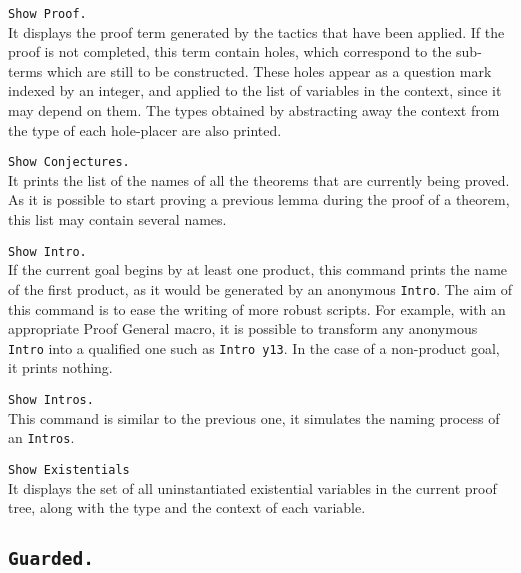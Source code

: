 \begin{Variants}
\item {\tt Show Proof.}\\
It displays the proof term generated by the 
tactics that have been applied. 
If the proof is not completed, this term contain holes,
which correspond to the sub-terms which are still to be 
constructed. These holes appear as a question mark indexed 
by an integer, and applied to the list of variables in 
the context, since it may depend on them. 
The types obtained by abstracting away the context from the
type of each hole-placer are also printed.

\item {\tt Show Conjectures.}\\
It prints the list of the names of all the theorems that 
are currently being proved.
As it is possible to start proving a previous lemma during
the proof of a theorem, this list may contain several 
names. 

\item{\tt Show Intro.}\\
If the current goal begins by at least one product, this command
prints the name of the first product, as it would be generated by 
an anonymous {\tt Intro}. The aim of this command is to ease the
writing of more robust scripts. For example, with an appropriate 
Proof General macro, it is possible to transform any anonymous {\tt
  Intro} into a qualified one such as {\tt Intro y13}.
In the case of a non-product goal, it prints nothing. 

\item{\tt Show Intros.}\\
This command is similar to the previous one, it simulates the naming 
process of an {\tt Intros}.

\item{\tt Show Existentials\label{ShowExistentials}}
\\ It displays
the set of all uninstantiated existential variables in the current proof tree, 
along with the type and the context of each variable.

\end{Variants}


\subsection[\tt Guarded.]{\tt Guarded.\label{Guarded}}

